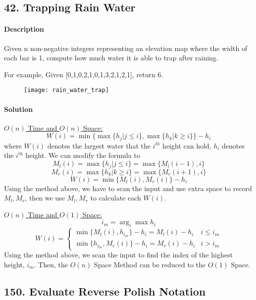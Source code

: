 \subsection{42. Trapping Rain Water}

\paragraph{\color{white} \colorbox{Mahogany}{Description}}

Given n non-negative integers representing an elevation map where the width of each bar is 1, compute how much water it is able to trap after raining.

For example, 
Given [0,1,0,2,1,0,1,3,2,1,2,1], return 6.

\begin{figure}[ht]
    \centering
    \texttt{[image: rain\_water\_trap]}
    \label{fig:rain_water_trap}
\end{figure}

\paragraph{\color{white} \colorbox{OliveGreen}{Solution}}
\underline{$O(n)$ Time and $O(n)$ Space:}
$$W(i)=\min\{\max\{h_j|j\leqslant i\},\max\{h_k|k\geqslant i\}\}-h_i$$
where $W(i)$ denotes the largest water that the $i^{th}$ height can hold, $h_i$ denotes the $i^{th}$ height. We can modify the formula to
$$M_l(i)=\max\{h_j|j\leqslant i\}=\max\{M_l(i-1),i\}$$
$$M_r(i)=\max\{h_k|k\geqslant i\}=\max\{M_r(i+1),i\}$$
$$W(i)=\min\{M_l(i),M_r(i)\}-h_i$$
Using the method above, we have to scan the input and use extra space to record $M_l,M_r$, then we use $M_l,M_r$ to calculate each $W(i)$.


\underline{$O(n)$ Time and $O(1)$ Space:}
$$i_m=\arg_i\max h_i$$
\begin{equation*}
    W(i)=\begin{cases}
    \min\{M_l(i),h_{i_m}\}-h_i=M_l(i)-h_i & i\leqslant i_m\\
    \min\{h_{i_m},M_r(i)\}-h_i=M_r(i)-h_i & i>i_m
    \end{cases}
\end{equation*}
Using the method above, we scan the input to find the index of the highest height, $i_m$. Then, the $O(n)$ Space Method can be reduced to the $O(1)$ Space.

\subsection{150. Evaluate Reverse Polish Notation}

